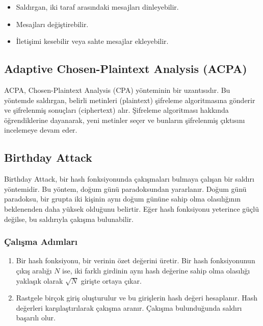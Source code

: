 \begin{itemize}
    \item Saldırgan, iki taraf arasındaki mesajları dinleyebilir.
    \item Mesajları değiştirebilir.
    \item İletişimi kesebilir veya sahte mesajlar ekleyebilir.
\end{itemize}

\newpage

\subsection{Adaptive Chosen-Plaintext Analysis (ACPA)}

ACPA, Chosen-Plaintext Analysis (CPA) yönteminin bir uzantısıdır. Bu yöntemde saldırgan, belirli metinleri (plaintext) şifreleme algoritmasına gönderir ve şifrelenmiş sonuçları (ciphertext) alır. Şifreleme algoritması hakkında öğrendiklerine dayanarak, yeni metinler seçer ve bunların şifrelenmiş çıktısını incelemeye devam eder.

\newpage

\subsection{Birthday Attack}

Birthday Attack, bir hash fonksiyonunda çakışmaları bulmaya çalışan bir saldırı yöntemidir. Bu yöntem, doğum günü paradoksundan yararlanır. Doğum günü paradoksu, bir grupta iki kişinin aynı doğum gününe sahip olma olasılığının beklenenden daha yüksek olduğunu belirtir. Eğer hash fonksiyonu yeterince güçlü değilse, bu saldırıyla çakışma bulunabilir.

\subsubsection{Çalışma Adımları}

\begin{enumerate}
    \item Bir hash fonksiyonu, bir verinin özet değerini üretir. Bir hash fonksiyonunun çıkış aralığı $N$ ise, iki farklı girdinin aynı hash değerine sahip olma olasılığı yaklaşık olarak $\sqrt{N}$ girişte ortaya çıkar.
    \item Rastgele birçok giriş oluşturulur ve bu girişlerin hash değeri hesaplanır. Hash değerleri karşılaştırılarak çakışma aranır. Çakışma bulunduğunda saldırı başarılı olur. 
\end{enumerate}

